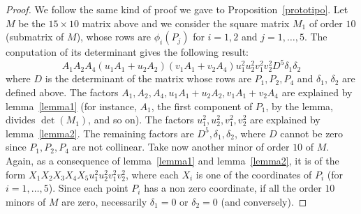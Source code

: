 \documentclass{amsart}
\theoremstyle{plain}
\theoremstyle{definition}
\begin{document}
\begin{proof}
  We follow the same kind of proof we gave to Proposition~\ref{prototipo}.
  Let $M$ be the $15 \times 10$ matrix above and we consider the square
  matrix $M_1$ of order $10$ (submatrix of $M$),
  whose rows are $\phi_i(P_j)$ for $i = 1, 2$ and $j = 1, \dots, 5$.
  The conputation of its determinant gives the following result:
  \[
  A_1 A_2 A_4(u_1A_1+u_2A_2)(v_1A_1+v_2A_4)u_1^2u_2^2v_1^2v_2^2 D^5
  \delta_1 \delta_2
  \]
  where $D$ is the determinant of the matrix whose rows are
  $P_1, P_2, P_4$ and $\delta_1$, $\delta_2$ are defined above.
  The factors $A_1, A_2, A_4, u_1A_1+u_2A_2, v_1A_1+v_2A_4$ are explained by
  lemma~\ref{lemma1} (for instance, $A_1$, the first component of $P_1$,
  by the lemma, divides $\det(M_1)$, and so on). The factors
  $u_1^2,u_2^2,v_1^2,v_2^2$ are explained by lemma~\ref{lemma2}. The remaining
  factors are $D^5, \delta_1, \delta_2$, where $D$ cannot be zero since
  $P_1, P_2, P_4$ are not collinear. Take now another minor of order
  $10$ of $M$. Again, as a consequence of lemma~\ref{lemma1} and
  lemma~\ref{lemma2}, it is of the form $X_1X_2X_3X_4X_5 u_1^2u_2^2v_1^2v_2^2$,
  where each $X_i$ is one of the coordinates of $P_i$ (for $i=1, \dots, 5$).
  Since each point $P_i$ has a non zero coordinate, if all the order
  $10$ minors of $M$ are zero, necessarily $\delta_1=0$ or $\delta_2=0$
  (and conversely).
\end{proof}
\end{document}
